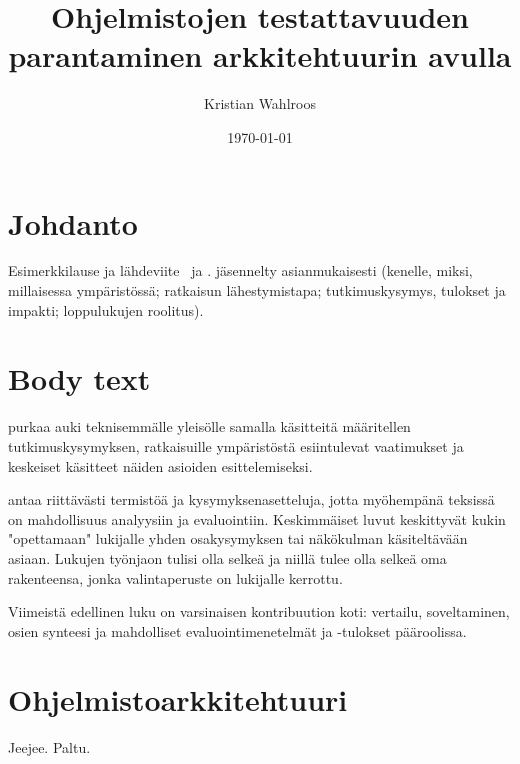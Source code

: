 \documentclass[finnish]{tktltiki2}
\title{Ohjelmistojen testattavuuden parantaminen arkkitehtuurin avulla}
\author{Kristian Wahlroos}
\date{\today}
\theoremstyle{definition}
\theoremstyle{remark}
\begin{document}

\frontmatter      %

\maketitle        %
\makeabstract     %

\tableofcontents  %


\mainmatter       %

\section{Johdanto}


Esimerkkilause ja lähdeviite~\cite{esimerkki} ja \cite{esimerkki2}.
jäsennelty asianmukaisesti (kenelle, miksi, millaisessa ympäristössä; ratkaisun lähestymistapa; tutkimuskysymys, tulokset ja impakti; loppulukujen roolitus).



\section{Body text}
purkaa auki teknisemmälle yleisölle samalla käsitteitä määritellen tutkimuskysymyksen, ratkaisuille ympäristöstä esiintulevat vaatimukset ja keskeiset käsitteet näiden asioiden esittelemiseksi.

antaa riittävästi termistöä ja kysymyksenasetteluja, jotta myöhempänä teksissä on mahdollisuus analyysiin ja evaluointiin.
Keskimmäiset luvut keskittyvät kukin "opettamaan" lukijalle yhden osakysymyksen tai näkökulman käsiteltävään asiaan. Lukujen työnjaon tulisi olla selkeä ja niillä tulee olla selkeä oma rakenteensa, jonka valintaperuste on lukijalle kerrottu.

Viimeistä edellinen luku on varsinaisen kontribuution koti: vertailu, soveltaminen, osien synteesi ja mahdolliset evaluointimenetelmät ja -tulokset pääroolissa.

\section{Ohjelmistoarkkitehtuuri}
Jeejee. Paltu.
\end{document}
